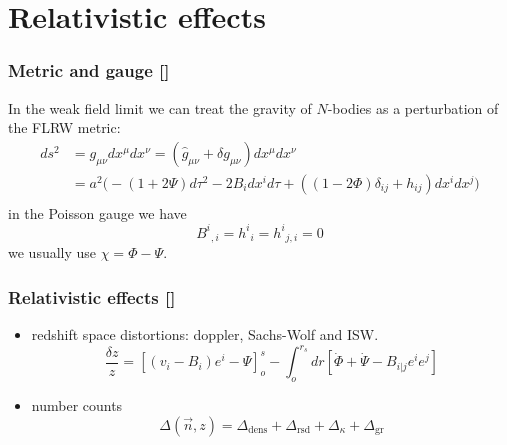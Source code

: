 \documentclass{beamer}
\makeatletter
\newcommand{\mylabel}{%
   [\beamer@againname]}
\makeatother
\begin{document}
\section{Relativistic effects}
\frame{\sectionpage}


\begin{frame}[label=metric]
    \frametitle{Metric and gauge\mylabel}
   \newcommand{\qq}{p^2+m^2 a^2}
    In the weak field limit we can treat the gravity of $N$-bodies 
    as a perturbation of the FLRW metric:
    \begin{equation}
    \begin{split}
        ds^2
        &= g_{\mu\nu} dx^{\mu}dx^{\nu} = (\hat g_{\mu\nu} + \delta
        g_{\mu\nu})dx^{\mu} dx^{\nu} \\
        &= a^2 \big( 
            - (1+2\Psi)d\tau^2
            - 2 B_i dx^i d\tau
             + ((1-2\Phi) \delta_{ij}+ h_{ij}) dx^i dx^j \big) \\
    \end{split}
    \end{equation}
    in the Poisson gauge we have
    \[
        B^i{}_{,i} =  h^{i}{}_i =  h^i{}_{j,i} = 0
    \]
    we usually use $\chi=\Phi-\Psi$.
\end{frame}


\begin{frame}[label=greffects]
    \frametitle{Relativistic effects\mylabel}
    \begin{itemize}
        \item redshift space distortions: doppler, Sachs-Wolf and ISW.
        \[
            \frac{\delta z}{z}
            =  [ (v_i - B_i) e^i - \Psi ]^s_{o} - \int_o^{r_s} dr
            [\dot\Phi+\dot\Psi -
            B_{i|j} e^i e^j]
        \]
        \item number counts
        \[
            \Delta (\vec n, z) = 
            \Delta_{\mathrm{dens}}
            + \Delta_{\mathrm{rsd}}  %
            + \Delta_{\kappa}        %
            + \Delta_{\mathrm{gr}}   %
        \]
    \end{itemize}
\end{frame}
\end{document}
